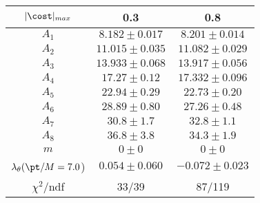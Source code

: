 \begin{tabular}{c|c|c}
$|\cost|_{max}$ & 0.3 & 0.8\\
\hline
$A_1$ & $8.182\pm0.017$ & $8.201\pm0.014$ \\
$A_2$ & $11.015\pm0.035$ & $11.082\pm0.029$ \\
$A_3$ & $13.933\pm0.068$ & $13.917\pm0.056$ \\
$A_4$ & $17.27\pm0.12$ & $17.332\pm0.096$ \\
$A_5$ & $22.94\pm0.29$ & $22.73\pm0.20$ \\
$A_6$ & $28.89\pm0.80$ & $27.26\pm0.48$ \\
$A_7$ & $30.8\pm1.7$ & $32.8\pm1.1$ \\
$A_8$ & $36.8\pm3.8$ & $34.3\pm1.9$ \\
$m$ & $0\pm0$ & $0\pm0$ \\
$\lambda_\theta(\pt/M = 7.0$) & $0.054\pm0.060$ & $-0.072\pm0.023$ \\
\hline
$\chi^2$/ndf & 33/39 & 87/119
\end{tabular}
